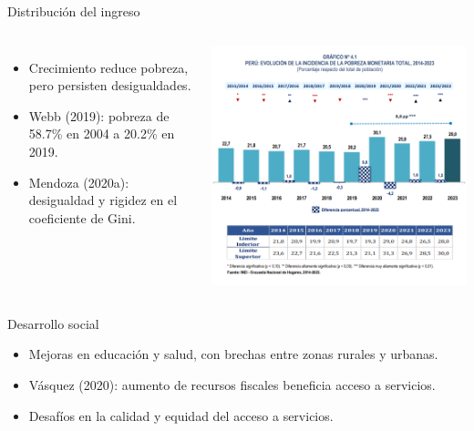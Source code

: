 \documentclass[aspectratio=169]{beamer}
\begin{document}
\begin{frame}{\Large Distribución del ingreso}
    \begin{columns}
            \Large
            \begin{itemize}
                \item Crecimiento reduce pobreza, pero persisten desigualdades.
                \item Webb (2019): pobreza de 58.7\% en 2004 a 20.2\% en 2019.
                \item Mendoza (2020a): desigualdad y rigidez en el coeficiente de Gini.
            \end{itemize}
            \includegraphics[width=\textwidth]{images/pobreza.png}
    \end{columns}
\end{frame}

\begin{frame}{\Large Desarrollo social}
    \Large
    \begin{itemize}
        \item Mejoras en educación y salud, con brechas entre zonas rurales y urbanas.
        \item Vásquez (2020): aumento de recursos fiscales beneficia acceso a servicios.
        \item Desafíos en la calidad y equidad del acceso a servicios.
    \end{itemize}
\end{frame}
\end{document}
